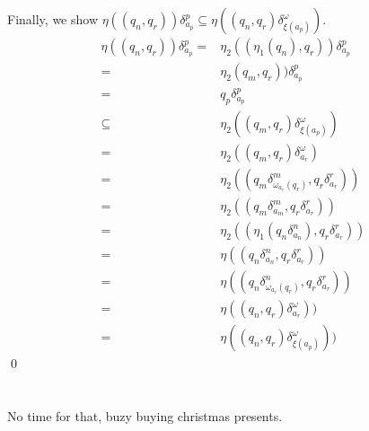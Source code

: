 \documentclass[a4paper,12pt,numbers=noenddot]{scrreport}
\begin{document}
Finally, we show $\eta((q_n,q_r))\delta^p_{a_p} \subseteq \eta((q_n, q_r) \delta^\omega_{\xi(a_p)})$.
\begin{align*}
    \eta((q_n,q_r))\delta^p_{a_p} = & \eta_2((\eta_1 (q_n),q_r))\delta^p_{a_p} \tag{def. $\eta, \eta_1$} \\
                      = & \eta_2(q_m,q_r))\delta^p_{a_p} \tag{def. $\eta_2$} \\
                      = & q_p\delta^p_{a_p} \tag{$P \leq M \omega R$} \\
                      \subseteq & \eta_2((q_m, q_r) \delta^\omega_{\xi(a_p)}) \tag{def. $\xi$}\\
                      = & \eta_2((q_m, q_r) \delta^\omega_{a_r}) \tag{def. $\delta^\omega$}\\
                      = & \eta_2((q_m \delta^m_{\omega_{a_r}(q_r)}, q_r \delta^r_{a_r})) \tag{def. $\omega$}\\
                      = & \eta_2((q_m \delta^m_{a_m}, q_r \delta^r_{a_r})) \tag{$M \leq N$}\\
                      = & \eta_2((\eta_1(q_n \delta^n_{a_n}), q_r \delta^r_{a_r})) \tag{def. $\eta$}\\
                      = & \eta((q_n \delta^n_{a_n}, q_r \delta^r_{a_r})) \tag{def. $\omega$}\\
                      = & \eta((q_n \delta^n_{\omega_{a_r}(q_r)}, q_r \delta^r_{a_r})) \tag{def. $\delta^\omega$}\\
                      = & \eta((q_n, q_r) \delta^\omega_{a_r})) \tag{def. $\xi$}\\
                      = & \eta((q_n, q_r) \delta^\omega_{\xi(a_p)}))
\end{align*}
\qed
\section{}
No time for that, buzy buying christmas presents.
\end{document}

